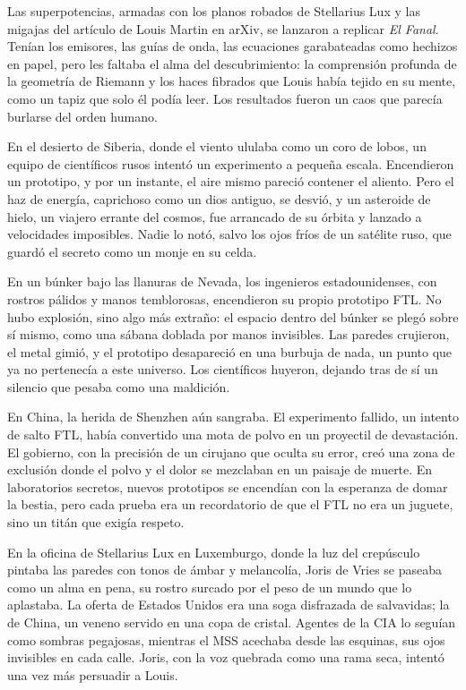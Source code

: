 Las superpotencias, armadas con los planos robados de Stellarius Lux y las migajas del artículo de Louis Martin en arXiv, se lanzaron a replicar \emph{El Fanal}. Tenían los emisores, las guías de onda, las ecuaciones garabateadas como hechizos en papel, pero les faltaba el alma del descubrimiento: la comprensión profunda de la geometría de Riemann y los haces fibrados que Louis había tejido en su mente, como un tapiz que solo él podía leer. Los resultados fueron un caos que parecía burlarse del orden humano.

En el desierto de Siberia, donde el viento ululaba como un coro de lobos, un equipo de científicos rusos intentó un experimento a pequeña escala. Encendieron un prototipo, y por un instante, el aire mismo pareció contener el aliento. Pero el haz de energía, caprichoso como un dios antiguo, se desvió, y un asteroide de hielo, un viajero errante del cosmos, fue arrancado de su órbita y lanzado a velocidades imposibles. Nadie lo notó, salvo los ojos fríos de un satélite ruso, que guardó el secreto como un monje en su celda.

En un búnker bajo las llanuras de Nevada, los ingenieros estadounidenses, con rostros pálidos y manos temblorosas, encendieron su propio prototipo FTL. No hubo explosión, sino algo más extraño: el espacio dentro del búnker se plegó sobre sí mismo, como una sábana doblada por manos invisibles. Las paredes crujieron, el metal gimió, y el prototipo desapareció en una burbuja de nada, un punto que ya no pertenecía a este universo. Los científicos huyeron, dejando tras de sí un silencio que pesaba como una maldición.

En China, la herida de Shenzhen aún sangraba. El experimento fallido, un intento de salto FTL, había convertido una mota de polvo en un proyectil de devastación. El gobierno, con la precisión de un cirujano que oculta su error, creó una zona de exclusión donde el polvo y el dolor se mezclaban en un paisaje de muerte. En laboratorios secretos, nuevos prototipos se encendían con la esperanza de domar la bestia, pero cada prueba era un recordatorio de que el FTL no era un juguete, sino un titán que exigía respeto.

En la oficina de Stellarius Lux en Luxemburgo, donde la luz del crepúsculo pintaba las paredes con tonos de ámbar y melancolía, Joris de Vries se paseaba como un alma en pena, su rostro surcado por el peso de un mundo que lo aplastaba. La oferta de Estados Unidos era una soga disfrazada de salvavidas; la de China, un veneno servido en una copa de cristal. Agentes de la CIA lo seguían como sombras pegajosas, mientras el MSS acechaba desde las esquinas, sus ojos invisibles en cada calle. Joris, con la voz quebrada como una rama seca, intentó una vez más persuadir a Louis.

